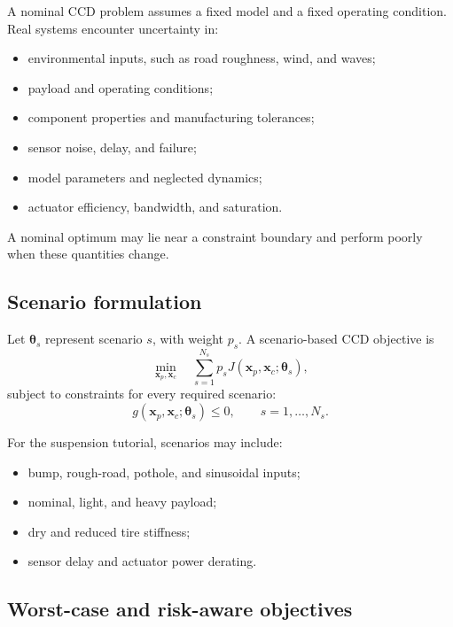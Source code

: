 \documentclass[11pt]{article}
\newcommand{\vect}[1]{\boldsymbol{#1}}
\newcommand{\xp}{\vect{x}_p}
\newcommand{\xc}{\vect{x}_c}
\newcommand{\thetavec}{\boldsymbol{\theta}}
\begin{document}
A nominal CCD problem assumes a fixed model and a fixed operating condition. Real systems encounter uncertainty in:
\begin{itemize}[leftmargin=1.4em]
  \item environmental inputs, such as road roughness, wind, and waves;
  \item payload and operating conditions;
  \item component properties and manufacturing tolerances;
  \item sensor noise, delay, and failure;
  \item model parameters and neglected dynamics;
  \item actuator efficiency, bandwidth, and saturation.
\end{itemize}

A nominal optimum may lie near a constraint boundary and perform poorly when these quantities change.

\subsection{Scenario formulation}

Let $\thetavec_s$ represent scenario $s$, with weight $p_s$. A scenario-based CCD objective is
\begin{equation}
\min_{\xp,\xc} \quad \sum_{s=1}^{N_s} p_s J(\xp,\xc;\thetavec_s),
\label{eq:scenario-mean}
\end{equation}
subject to constraints for every required scenario:
\begin{equation}
g(\xp,\xc;\thetavec_s)\le 0, \qquad s=1,\ldots,N_s.
\end{equation}

For the suspension tutorial, scenarios may include:
\begin{itemize}[leftmargin=1.4em]
  \item bump, rough-road, pothole, and sinusoidal inputs;
  \item nominal, light, and heavy payload;
  \item dry and reduced tire stiffness;
  \item sensor delay and actuator power derating.
\end{itemize}

\subsection{Worst-case and risk-aware objectives}
\end{document}
